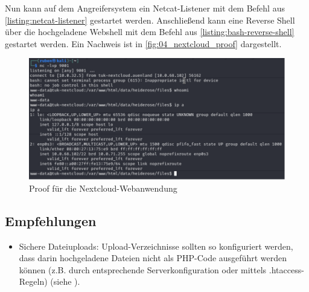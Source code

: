 Nun kann auf dem Angreifersystem ein Netcat-Listener mit dem Befehl aus \autoref{listing:netcat-listener} gestartet werden. Anschließend kann eine Reverse Shell über die hochgeladene Webshell mit dem Befehl aus \autoref{listing:bash-reverse-shell} gestartet werden. Ein Nachweis ist in \autoref{fig:04_nextcloud_proof} dargestellt.

\begin{figure}[!ht]
    \centering
    \includegraphics[width=\linewidth]{images/proofs/04_nextcloud_proof.png}
    \caption{Proof für die Nextcloud-Webanwendung}
    \label{fig:04_nextcloud_proof}
\end{figure}

\subsection*{Empfehlungen}
\begin{itemize}
    \item Sichere Dateiuploads: Upload-Verzeichnisse sollten so konfiguriert werden, dass darin hochgeladene Dateien nicht als PHP-Code ausgeführt werden können (z.B. durch entsprechende Serverkonfiguration oder mittels .htaccess-Regeln) (siehe \cite{owaspFileUpload}).
\end{itemize}

